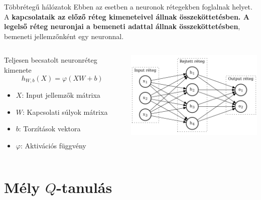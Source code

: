 \documentclass[english, aspectratio=169]{beamer}
\makeatletter
\let\origtableofcontents=\tableofcontents
\def\tableofcontents{\@ifnextchar[{\origtableofcontents}{\gobbletableofcontents}}
\def\gobbletableofcontents#1{\origtableofcontents}
\makeatother
\begin{document}
\begin{frame}{Többrétegű hálózatok}
Ebben az esetben a neuronok rétegekben foglalnak helyet. A\textbf{ kapcsolataik az előző réteg kimeneteivel állnak összeköttetésben. A legelső réteg neuronjai a bemeneti adattal állnak összeköttetésben}, bemeneti jellemzőnként egy neuronnal.\par\smallskip
\begin{columns}
\begin{column}{.5\textwidth}
\begin{block}{Teljesen becsatolt neuronréteg kimenete}
\[
h_{W,b}(X)=\varphi(XW+b)
\]
\vspace{-0.5cm}
\begin{itemize}
	\item $X$: Input jellemzők mátrixa
	\item $W$: Kapcsolati súlyok mátrixa
	\item $b$: Torzítások vektora
	\item $\varphi$: Aktivációs függvény
\end{itemize}
\end{block}
\end{column}
\begin{column}{.5\textwidth}
\begin{center}
\includegraphics[width=7cm, keepaspectratio]{../../7_dl/doc/graphs/dl_0.png}
\end{center}
\end{column}
\end{columns}
\end{frame}

\section{Mély $Q$-tanulás}

\begin{frame}
\tableofcontents[currentsection]
\end{frame}
\end{document}
